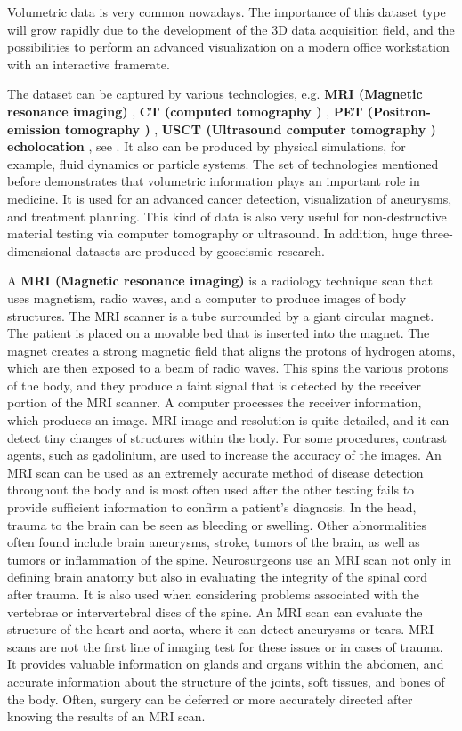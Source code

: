 Volumetric data is very common nowadays. The importance of this dataset type will grow rapidly due to the development of the 3D data acquisition field, and the possibilities to perform an advanced visualization on a modern office workstation with an interactive framerate.


The dataset can be captured by various technologies, e.g. \textbf{  MRI (Magnetic resonance imaging) } , \textbf{ CT (computed tomography ) }, \textbf{PET (Positron-emission tomography ) }, \textbf{ USCT (Ultrasound computer tomography ) echolocation }, see \cite{radiology} . It also can be produced by physical simulations, for example, fluid dynamics or particle systems. The set of technologies mentioned before demonstrates that volumetric information plays an important role in medicine. It is used for an advanced cancer detection, visualization of aneurysms, and treatment planning. This kind of data is also very useful for non-destructive material testing via computer tomography or ultrasound. In addition, huge three-dimensional datasets are produced by geoseismic research.


A \textbf{  MRI (Magnetic resonance imaging) } is a radiology technique scan that uses magnetism, radio waves, and a computer to produce images of body structures. The MRI scanner is a tube surrounded by a giant circular magnet. The patient is placed on a movable bed that is inserted into the magnet. The magnet creates a strong magnetic field that aligns the protons of hydrogen atoms, which are then exposed to a beam of radio waves. This spins the various protons of the body, and they produce a faint signal that is detected by the receiver portion of the MRI scanner. A computer processes the receiver information, which produces an image.
MRI image and resolution is quite detailed, and it can detect tiny changes of structures within the body. For some procedures, contrast agents, such as gadolinium, are used to increase the accuracy of the images. \newline  An MRI scan can be used as an extremely accurate method of disease detection throughout the body and is most often used after the other testing fails to provide sufficient information to confirm a patient's diagnosis. In the head, trauma to the brain can be seen as bleeding or swelling. Other abnormalities often found include brain aneurysms, stroke, tumors of the brain, as well as tumors or inflammation of the spine.  \newline Neurosurgeons use an MRI scan not only in defining brain anatomy but also in evaluating the integrity of the spinal cord after trauma. It is also used when considering problems associated with the vertebrae or intervertebral discs of the spine. An MRI scan can evaluate the structure of the heart and aorta, where it can detect aneurysms or tears. MRI scans are not the first line of imaging test for these issues or in cases of trauma.  \newline It provides valuable information on glands and organs within the abdomen, and accurate information about the structure of the joints, soft tissues, and bones of the body. Often, surgery can be deferred or more accurately directed after knowing the results of an MRI scan.




